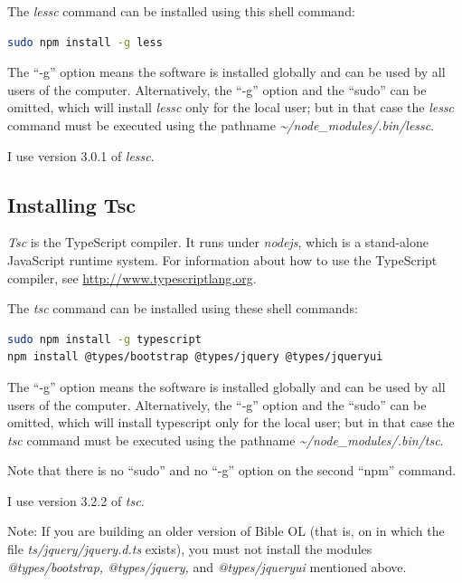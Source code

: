 \documentclass[11pt,oneside,a4paper]{memoir}
\begin{document}
The \emph{lessc} command can be installed using this shell command:
 
\begin{lstlisting}[language=bash]
sudo npm install -g less
\end{lstlisting}
 
The ``-g'' option means the software is installed globally and can be used by all users of the
computer. Alternatively, the ``-g'' option and the ``sudo'' can be omitted, which will install
\emph{lessc} only for the local user; but in that case the \emph{lessc} command must be executed using
the pathname \mbox{\emph{\textasciitilde/node\_modules/.bin/lessc}}.
 
I use version 3.0.1 of \emph{lessc}.

\subsection{Installing Tsc}\label{sec-installing-tsc}\label{sec-install-end}
 
\emph{Tsc} is the TypeScript compiler. It
runs under \emph{nodejs}, which is a stand-alone JavaScript runtime
system. For information about how to use the TypeScript compiler, see
\url{http://www.typescriptlang.org}.

The \emph{tsc} command can be installed using these shell commands:
 
\begin{lstlisting}[language=bash]
sudo npm install -g typescript
npm install @types/bootstrap @types/jquery @types/jqueryui
\end{lstlisting}

The ``-g'' option means the software is installed globally and can be used by all users of the
computer. Alternatively, the ``-g'' option and the ``sudo'' can be omitted, which will install
typescript only for the local user; but in that case the \emph{tsc} command must be executed using
the pathname \mbox{\emph{\textasciitilde/node\_modules/.bin/tsc}}.

Note that there is no ``sudo'' and no ``-g'' option on the second ``npm'' command.

I use version 3.2.2 of \emph{tsc}.

Note: If you are building an older version of Bible OL (that is, on in which the file
\mbox{\emph{ts/jquery/jquery.d.ts}} exists), you must not install the modules \emph{@types/bootstrap,
  @types/jquery,} and \emph{@types/jqueryui} mentioned above.
\end{document}
